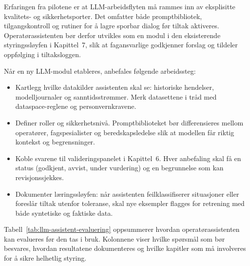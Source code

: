 Erfaringen fra pilotene er at LLM-arbeidsflyten må rammes inn av eksplisitte kvalitets- og sikkerhetsporter.\citep{dnv2023digitalassurance,microsoft2023copilot} Det omfatter både promptbibliotek, tilgangskontroll og rutiner for å lagre sporbar dialog før tiltak aktiveres. Operatørassistenten bør derfor utvikles som en modul i den eksisterende styringssløyfen i Kapittel~7, slik at fagansvarlige godkjenner forslag og tildeler oppfølging i tiltaksloggen.

Når en ny LLM-modul etableres, anbefales følgende arbeidssteg:
\begin{itemize}
    \item Kartlegg hvilke datakilder assistenten skal se: historiske hendelser, modelljournaler og sanntidsstrømmer. Merk datasettene i tråd med dataspace-reglene og personvernkravene.
    \item Definer roller og sikkerhetsnivå. Promptbiblioteket bør differensieres mellom operatører, fagspesialister og beredskapsledelse slik at modellen får riktig kontekst og begrensninger.
    \item Koble svarene til valideringspanelet i Kapittel~6. Hver anbefaling skal få en status (godkjent, avvist, under vurdering) og en begrunnelse som kan revisjonssjekkes.
    \item Dokumenter læringssløyfen: når assistenten feilklassifiserer situasjoner eller foreslår tiltak utenfor toleranse, skal nye eksempler flagges for retrening med både syntetiske og faktiske data.
\end{itemize}

Tabell~\ref{tab:llm-assistent-evaluering} oppsummerer hvordan operatørassistenten kan evalueres før den tas i bruk. Kolonnene viser hvilke spørsmål som bør besvares, hvordan resultatene dokumenteres og hvilke kapitler som må involveres for å sikre helhetlig styring.

